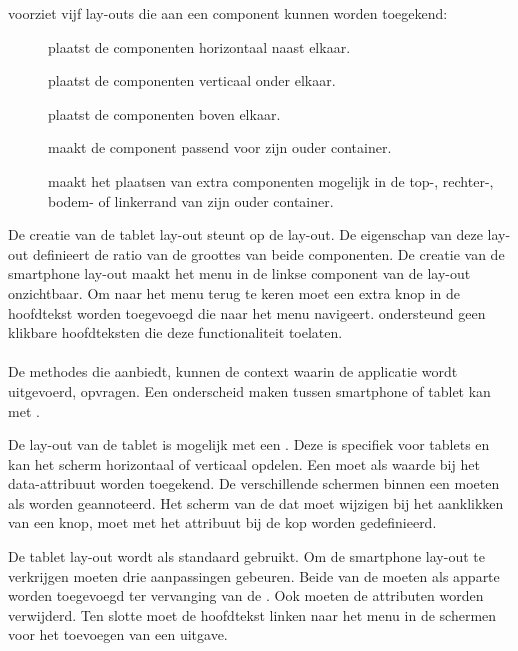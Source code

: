 \st{} voorziet vijf lay-outs die aan een component kunnen worden toegekend:
\begin{description}
 \item [] plaatst de componenten horizontaal naast elkaar.
 \item [] plaatst de componenten verticaal onder elkaar.
 \item [] plaatst de componenten boven elkaar.
 \item [] maakt de component passend voor zijn ouder container.
 \item [] maakt het plaatsen van extra componenten mogelijk in de top-, rechter-, bodem- of linkerrand van zijn ouder container.
\end{description}
De creatie van de tablet lay-out steunt op de  lay-out.
De  eigenschap van deze lay-out definieert de ratio van de groottes van beide componenten.
De creatie van de smartphone lay-out maakt het menu in de linkse component van de lay-out onzichtbaar.
Om naar het menu terug te keren moet een extra knop in de hoofdtekst worden toegevoegd die naar het menu navigeert.
\st{} ondersteund geen klikbare hoofdteksten die deze functionaliteit toelaten.

\paragraph{\kendo}
De methodes die  aanbiedt, kunnen de context waarin de applicatie wordt uitgevoerd, opvragen.
Een onderscheid maken tussen smartphone of tablet kan met .

De lay-out van de tablet is mogelijk met een .
Deze  is specifiek voor tablets en kan het scherm horizontaal of verticaal opdelen.
Een  moet als waarde bij het data-attribuut  worden toegekend.
De verschillende schermen binnen een  moeten als  worden geannoteerd.
Het scherm van de  dat moet wijzigen bij het aanklikken van een knop, moet met het  attribuut bij de kop worden gedefinieerd.

De tablet lay-out wordt als standaard gebruikt.
Om de smartphone lay-out te verkrijgen moeten drie aanpassingen gebeuren.
Beide  van de  moeten als apparte  worden toegevoegd ter vervanging van de .
Ook moeten de  attributen worden verwijderd.
Ten slotte moet de hoofdtekst linken naar het menu in de schermen voor het toevoegen van een uitgave.


